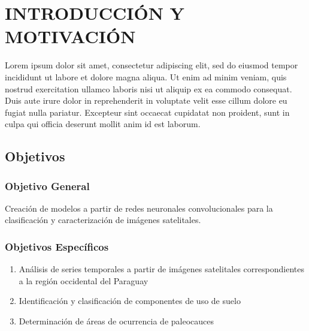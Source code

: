 \section{INTRODUCCIÓN Y MOTIVACIÓN}

Lorem ipsum dolor sit amet, consectetur adipiscing elit, sed do eiusmod tempor incididunt ut labore et dolore magna aliqua. Ut enim ad minim veniam, quis nostrud exercitation ullamco laboris nisi ut aliquip ex ea commodo consequat. Duis aute irure dolor in reprehenderit in voluptate velit esse cillum dolore eu fugiat nulla pariatur. Excepteur sint occaecat cupidatat non proident, sunt in culpa qui officia deserunt mollit anim id est laborum.

\subsection{Objetivos}

\subsubsection{Objetivo General}

Creación de modelos a partir de redes neuronales convolucionales para la clasificación y caracterización de imágenes satelitales.

\subsubsection{Objetivos Específicos}

\begin{enumerate}
    \item Análisis de series temporales a partir de imágenes satelitales correspondientes a la región occidental del Paraguay
    \item Identificación y clasificación de componentes de uso de suelo
    \item Determinación de áreas de ocurrencia de paleocauces
\end{enumerate}
